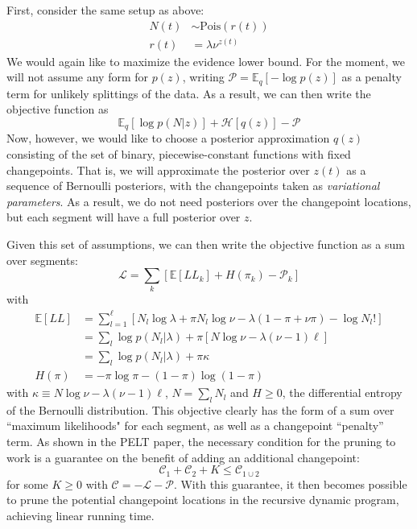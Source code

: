 \documentclass[11pt]{article}
\begin{document}
First, consider the same setup as above:
\begin{align}
    N(t) &\sim \mathrm{Pois}(r(t)) \\
    r(t) &= \lambda \nu^{z(t)}
\end{align}
We would again like to maximize the evidence lower bound. For the moment, we will not assume any form for $p(z)$, writing $\mathcal{P} = \mathbb{E}_q[-\log p(z)]$ as a penalty term for unlikely splittings of the data. As a result, we can then write the objective function as
\begin{equation}
    \mathbb{E}_q \left[\log p(N|z) \right] + \mathcal{H}[q(z)] - \mathcal{P}
\end{equation}
Now, however, we would like to choose a posterior approximation $q(z)$ consisting of the set of binary, piecewise-constant functions with fixed changepoints. That is, we will approximate the posterior over $z(t)$ as a sequence of Bernoulli posteriors, with the changepoints taken as \emph{variational parameters}. As a result, we do not need posteriors over the changepoint locations, but each segment will have a full posterior over $z$.

Given this set of assumptions, we can then write the objective function as a sum over segments:
\begin{equation}
    \mathcal{L} = \sum_k \left[
    \mathbb{E}[LL_k] + H(\pi_k)
    - \mathcal{P}_k
    \right]
\end{equation}
with
\begin{align}
    \mathbb{E}[LL] &= \sum_{l = 1}^\ell [N_l \log \lambda + \pi N_l \log \nu - \lambda (1 - \pi + \nu \pi) - \log N_l! ]\\
    &= \sum_l \log p(N_l|\lambda) + \pi [N\log \nu - \lambda (\nu - 1) \ell] \\
    &= \sum_l \log p(N_l|\lambda) + \pi \kappa \\
    H(\pi) &= -\pi \log \pi - (1 - \pi) \log (1 - \pi)
\end{align}
with $\kappa \equiv N\log \nu - \lambda (\nu - 1)\ell$, $N = \sum_l N_l$ and $H \ge 0$, the differential entropy of the Bernoulli distribution. This objective clearly has the form of a sum over ``maximum likelihoods" for each segment, as well as a changepoint ``penalty'' term. As shown in the PELT paper, the necessary condition for the pruning to work is a guarantee on the benefit of adding an additional changepoint:
\begin{equation}
    \label{pelt_condition}
    \mathcal{C}_1 + \mathcal{C}_2 + K \le \mathcal{C}_{1 \cup 2}
\end{equation}
for some $K \ge 0$ with $\mathcal{C} = -\mathcal{L} - \mathcal{P}$. With this guarantee, it then becomes possible to prune the potential changepoint locations in the recursive dynamic program, achieving linear running time.
\end{document}
